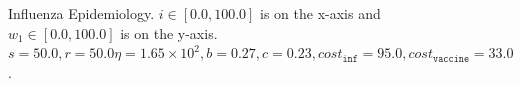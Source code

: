 \begin{figure}[h!]
    \centering
    \caption{Influenza Epidemiology. $ i \in \left[ 0.0, 100.0 \right]$ is on the x-axis and $ w_1 \in \left[ 0.0, 100.0 \right]$ is on the y-axis. $ s = 50.0, r = 50.0 \eta = 1.65 \times 10^2, b = 0.27, c = 0.23, cost_{\mathtt{inf}} = 95.0, cost_{\mathtt{vaccine}} = 33.0$.}
    \label{fig:robot1d}
\end{figure}


